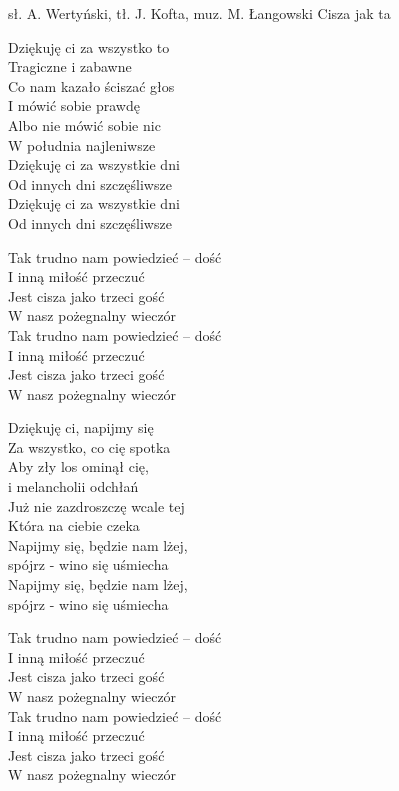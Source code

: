 {sł. A. Wertyński, tł. J. Kofta, muz. M. Łangowski}
{Cisza jak ta}
\begin{text}
    \begin{tinyTwelve}
    \hfill\break
    \hfill\break
    \hfill\break
    \hfill\break
Dziękuję ci za wszystko to \\
Tragiczne i zabawne \\
Co nam kazało ściszać głos \\
I mówić sobie prawdę \\
Albo nie mówić sobie nic \\
W południa najleniwsze \\
Dziękuję ci za wszystkie dni \\
Od innych dni szczęśliwsze \\
Dziękuję ci za wszystkie dni \\
Od innych dni szczęśliwsze

\vin Tak trudno nam powiedzieć – dość \\
\vin I inną miłość przeczuć \\
\vin Jest cisza jako trzeci gość \\
\vin W nasz pożegnalny wieczór \\
\vin Tak trudno nam powiedzieć – dość \\
\vin I inną miłość przeczuć \\
\vin Jest cisza jako trzeci gość \\
\vin W nasz pożegnalny wieczór

    \hfill\break
    \hfill\break
Dziękuję ci, napijmy się \\
Za wszystko, co cię spotka \\
Aby zły los ominął cię, \\
i melancholii odchłań \\
Już nie zazdroszczę wcale tej \\
Która na ciebie czeka \\
Napijmy się, będzie nam lżej, \\
spójrz - wino się uśmiecha \\
Napijmy się, będzie nam lżej, \\
spójrz - wino się uśmiecha

\vin Tak trudno nam powiedzieć – dość \\
\vin I inną miłość przeczuć \\
\vin Jest cisza jako trzeci gość \\
\vin W nasz pożegnalny wieczór \\
\vin Tak trudno nam powiedzieć – dość \\
\vin I inną miłość przeczuć \\
\vin Jest cisza jako trzeci gość \\
\vin W nasz pożegnalny wieczór


\end{tinyTwelve}
\end{text}
